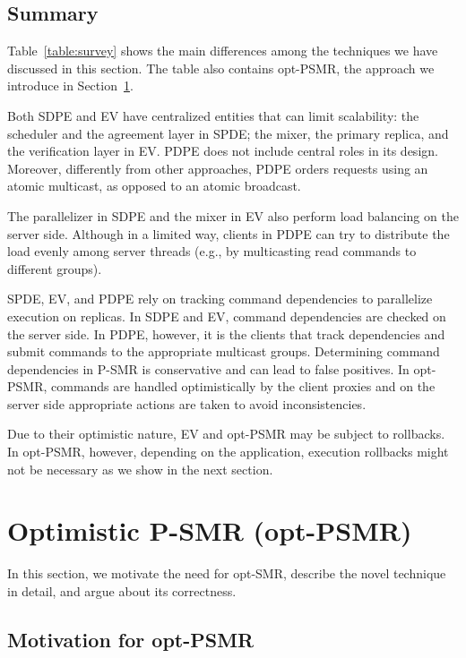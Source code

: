 \documentclass[conference]{IEEEtran}
\begin{document}
\subsection{Summary}
\label{subsec:summary}

Table~\ref{table:survey} shows the main differences among the techniques we have discussed in this section. 
The table also contains opt-PSMR, the approach we introduce in Section~\ref{sec:optpsmr}.

Both SDPE and EV have centralized entities that can limit scalability: the scheduler and the agreement layer in SPDE; the mixer, the primary replica, and the verification layer in EV. 
PDPE does not include central roles in its design. 
Moreover, differently from other approaches, PDPE orders requests using an atomic multicast, as opposed to an atomic broadcast.

The parallelizer in SDPE and the mixer in EV also perform load balancing on the server side. 
Although in a limited way, clients in PDPE can try to distribute the load evenly among server threads (e.g., by multicasting read commands to different groups).

SPDE, EV, and PDPE rely on tracking command dependencies to parallelize execution on replicas. 
In SDPE and EV, command dependencies are checked on the server side. 
In PDPE, however, it is the clients that track dependencies and submit commands to the appropriate multicast groups.
Determining command dependencies in P-SMR is conservative and can lead to false positives. 
In opt-PSMR, commands are handled optimistically by the client proxies and on the server side appropriate actions are taken to avoid inconsistencies. 

Due to their optimistic nature, EV and opt-PSMR may be subject to rollbacks.
In opt-PSMR, however, depending on the application, execution rollbacks might not be necessary as we show in the next section.








\section{Optimistic P-SMR (opt-PSMR)}
\label{sec:optpsmr}
In this section, we motivate the need for opt-SMR, describe the novel technique in detail, and argue about its correctness.
\subsection{Motivation for opt-PSMR}
\label{sec:opsmr-motiv}
\end{document}
